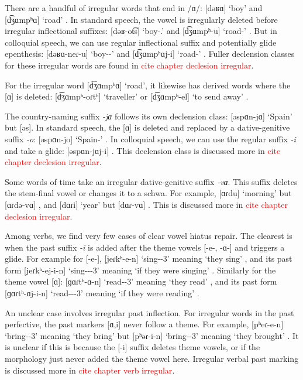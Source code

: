 {	
	There are a handful of irregular words that end in /ɑ/: [dəʁɑ] `boy'  and [d͡ʒɑmpʰɑ] `road' . In standard speech, the vowel is irregularly deleted before irregular inflectional suffixes: [dəʁ-ot͡s] `boy-{\pl}.{\gen}'  and [d͡ʒɑmpʰ-u] `road-{\gen}' . But in colloquial speech, we can use regular inflectional suffix and potentially glide epenthesis: [dəʁɑ-neɾ-u] `boy-{\pl}-{\gen}'  and [d͡ʒɑmpʰɑj-i]  `road-{\gen}' . Fuller declension classes for these irregular words are found in  \textcolor{red}{cite chapter declesion irregular}. 
	
	For the irregular word [d͡ʒɑmpʰɑ] `road', it likewise has derived words where the [ɑ] is deleted: [d͡ʒɑmpʰ-oɾtʰ] `traveller'  or [d͡ʒɑmpʰ-el] `to send away' . 
	
	The country-naming suffix \textit{-jɑ}  follows its own declension class: [əspɑn-jɑ] `Spain'  but [əs]. In standard speech, the [ɑ] is deleted and replaced by a dative-genitive suffix \textit{-o}: [əspɑn-jo] `Spain-{\gen}' . In colloquial speech, we can use the regular suffix \textit{-i} and take a glide: [əspɑn-jɑj-i] .  This declension class is discussed more in \textcolor{red}{cite chapter declesion irregular}. 
	
	Some words of time take an irregular dative-genitive suffix \textit{-vɑ}. This suffix deletes the stem-final vowel or changes it to a schwa. For example, [ɑɾdu] `morning'  but [ɑɾdə-vɑ] , and [dɑɾi] `year'  but [dɑɾ-vɑ] . This is discussed more in \textcolor{red}{cite chapter declesion irregular}. 
	
	Among verbs, we find very few cases of clear vowel hiatus repair. The clearest is when the past suffix \textit{-i} is added after the theme vowels [-e-, -ɑ-] and triggers a glide. For example for [-e-], [jeɾkʰ-e-n] `sing-{\thgloss}-3{\pl}' meaning `they sing' , and its past form [jeɾkʰ-ej-i-n] `sing-{\thgloss}-{\pst}-3{\pl}' meaning `if they were singing' . Similarly for the theme vowel [ɑ]: [ɡɑɾtʰ-ɑ-n] `read-{\thgloss}-3{\pl}' meaning `they read' , and its past form [ɡɑɾtʰ-ɑj-i-n] `read-{\thgloss}-{\pst}-3{\pl}' meaning `if they were reading' .
	
	An unclear case involves irregular past inflection. For irregular words in the past  perfective, the past markers [ɑ,i] never follow a theme.  For example, [pʰeɾ-e-n] `bring-{\thgloss}-3{\pl}' meaning `they bring'    but [pʰəɾ-i-n] `bring-{\pst}-3{\pl}' meaning `they brought' .
	It is unclear if this is because the [-i] suffix deletes theme vowels, or if the morphology just never  added the theme vowel here. Irregular verbal past marking is discussed more in \textcolor{red}{cite chapter verb irregular}.
}
